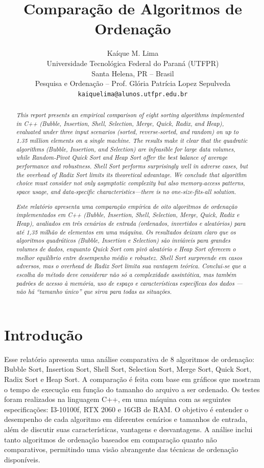 \documentclass[a4paper, 12pt]{article}
\title{\bf Comparação de Algoritmos de Ordenação}
\author{%
    Kaíque M. Lima \\
    Universidade Tecnológica Federal do Paraná (UTFPR) \\
    Santa Helena, PR -- Brasil\\[1ex]
    Pesquisa e Ordenação -- Prof. Glória Patrícia Lopez Sepulveda\\
    {\small \texttt{kaiquelima@alunos.utfpr.edu.br}}
}
\date{}  %
\begin{document}
\maketitle

\begin{abstract}
    \textit{
        This report presents an empirical comparison of eight sorting algorithms implemented in C++ (Bubble, Insertion, Shell, Selection, Merge, Quick, Radix, and Heap), evaluated under three input scenarios (sorted, reverse‐sorted, and random) on up to 1.35 million elements on a single machine. The results make it clear that the quadratic algorithms (Bubble, Insertion, and Selection) are infeasible for large data volumes, while Random‐Pivot Quick Sort and Heap Sort offer the best balance of average performance and robustness. Shell Sort performs surprisingly well in adverse cases, but the overhead of Radix Sort limits its theoretical advantage. We conclude that algorithm choice must consider not only asymptotic complexity but also memory‐access patterns, space usage, and data‐specific characteristics—there is no one-size-fits-all solution.
    }
\end{abstract}

\begin{abstract}
    \textit{
        Este relatório apresenta uma comparação empírica de oito algoritmos de ordenação implementados em C++ (Bubble, Insertion, Shell, Selection, Merge, Quick, Radix e Heap), avaliados em três cenários de entrada (ordenados, invertidos e aleatórios) para até 1,35 milhão de elementos em uma máquina. Os resultados deixam claro que os algoritmos quadráticos (Bubble, Insertion e Selection) são inviáveis para grandes volumes de dados, enquanto Quick Sort com pivô aleatório e Heap Sort oferecem o melhor equilíbrio entre desempenho médio e robustez. Shell Sort surpreende em casos adversos, mas o overhead de Radix Sort limita sua vantagem teórica. Conclui-se que a escolha do método deve considerar não só a complexidade assintótica, mas também padrões de acesso à memória, uso de espaço e características específicas dos dados — não há “tamanho único” que sirva para todas as situações.
        }
\end{abstract}

\section{Introdução}

    Esse relatório apresenta uma análise comparativa de 8 algoritmos de ordenação: Bubble Sort, Insertion Sort, Shell Sort, Selection Sort, Merge Sort, Quick Sort, Radix Sort e Heap Sort. A comparação é feita com base em gráficos que mostram o tempo de execução em função do tamanho do arquivo a ser ordenado. Os testes foram realizados na linguagem C++, em uma máquina com as seguintes especificações: I3-10100f, RTX 2060 e 16GB de RAM.
    O objetivo é entender o desempenho de cada algoritmo em diferentes cenários e tamanhos de entrada, além de discutir suas características, vantagens e desvantagens. A análise inclui tanto algoritmos de ordenação baseados em comparação quanto não comparativos, permitindo uma visão abrangente das técnicas de ordenação disponíveis.
\end{document}
